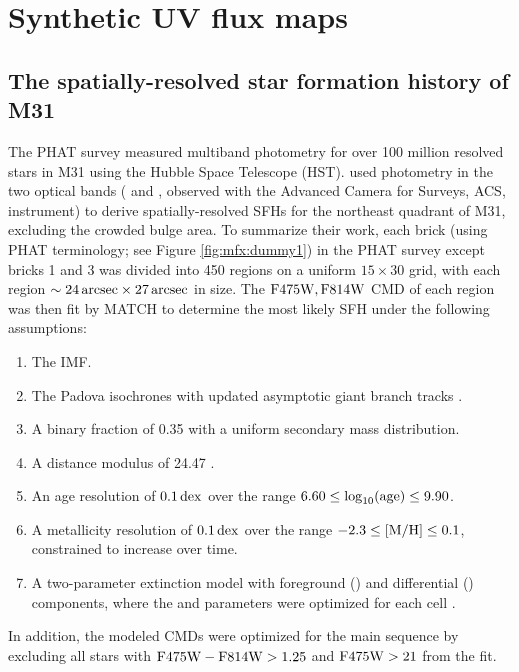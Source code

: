 \section{Synthetic UV flux maps}\label{mfx:syntheticfluxmaps}



\subsection{The spatially-resolved star formation history of M31}

The PHAT survey \citep{Dalcanton:2012} measured multiband photometry for over
100 million resolved stars in M31 using the Hubble Space Telescope (HST).
\citet{Lewis:2014} used photometry in the two optical bands (\acsb{} and
\acsi{}, observed with the Advanced Camera for Surveys, ACS, instrument) to
derive spatially-resolved SFHs for the northeast quadrant of M31, excluding the
crowded bulge area. To summarize their work, each brick (using PHAT
terminology; see Figure \ref{fig:mfx:dummy1}) in the PHAT survey except bricks
1 and 3 was divided into 450 regions on a uniform $15 \times 30$ grid, with
each region $\sim 24\,\mathrm{arcsec} \times 27\,\mathrm{arcsec}$ in size. The $\mathrm{F475W},\mathrm{F814W}$ CMD
of each region was then fit by MATCH \citep{Dolphin:2002} to determine the most
likely SFH under the following assumptions:

\begin{enumerate}
\item The \citet{Kroupa:2001} IMF.
\item The Padova isochrones \citep{Marigo:2008} with updated asymptotic giant
    branch tracks \citep{Girardi:2010}.
\item A binary fraction of 0.35 with a uniform secondary mass distribution.
\item A distance modulus of 24.47 \citep{McConnachie:2005}.
\item An age resolution of $0.1\,\mathrm{dex}$ over the range $6.60 \le
    \log_{10}(\mathrm{age}) \le 9.90$.
\item A metallicity resolution of $0.1\,\mathrm{dex}$ over the range $-2.3 \le \mathrm{[M/H]} \le
    0.1$, constrained to increase over time.
\item A two-parameter extinction model with foreground (\avf{}) and
    differential (\dav{}) components, where the \avf{} and \dav{} parameters
    were optimized for each cell \citep[see also][]{Simones:2014}.
\end{enumerate}

In addition, the modeled CMDs were optimized for the main sequence by excluding
all stars with $\mathrm{F475W} - \mathrm{F814W} > 1.25$ and $\mathrm{F475W} > 21$ from the fit.


